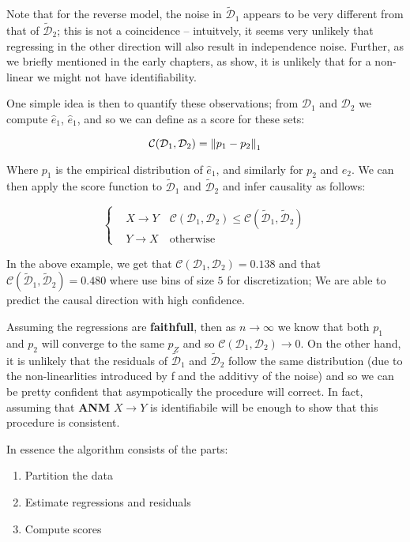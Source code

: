 Note that for the reverse model, the noise in $\mathcal{\tilde{D}}_1$ appears to be very different from 
that of $\mathcal{\tilde{D}}_2$; this is not a coincidence -- intuitvely, it seems very unlikely that 
regressing in the other direction will also result in independence noise. Further, as we briefly 
mentioned in the early chapters, as \cite{hoyer2009nonlinear} show, it is unlikely that for a non-linear 
we might not have identifiability. 

One simple idea is then to quantify these observations; from $\mathcal{D}_1$ and $\mathcal{D}_2$ we 
compute $\hat{e}_1$, $\hat{e}_1$, and so we can define as a score for these sets:

$$
     \mathcal{C}(\mathcal{D}_1, \mathcal{D}_2) = \left\lVert p_1 - p_2\right\rVert_1
$$

Where $p_1$ is the empirical distribution of $\hat{e}_1$, and similarly for $p_2$ and $\hat{e}_2$. We 
can then apply the score function to $\mathcal{\tilde{D}}_1$ and $\mathcal{\tilde{D}}_2$ and 
infer causality as follows:

\[ 
     \begin{cases} 
        & X \rightarrow Y \quad  \mathcal{C}(\mathcal{D}_1, \mathcal{D}_2) 
        \leq \mathcal{C}(\mathcal{\tilde{D}}_1, \mathcal{\tilde{D}}_2) \\
        & Y \rightarrow X \quad \text{otherwise}
     \end{cases}
\]

In the above example, we get that $\mathcal{C}(\mathcal{D}_1, \mathcal{D}_2) = 0.138$ and that
$\mathcal{C}(\mathcal{\tilde{D}}_1, \mathcal{\tilde{D}}_2) = 0.480$ where use bins of size $5$ 
for discretization; We are able to predict the causal direction with high confidence.

Assuming the regressions are \textbf{faithfull}, then as $n \rightarrow \infty$ we know that both 
$p_1$ and $p_2$ will converge to the same $p_Z$ and so $\mathcal{C}(\mathcal{D}_1, \mathcal{D}_2) \rightarrow 0$.
On the other hand, it is unlikely that the residuals of $\mathcal{\tilde{D}}_1$ and $\mathcal{\tilde{D}}_2$ 
follow the same distribution (due to the non-linearlities introduced by f and the additivy of the noise) and 
so we can be pretty confident that asympotically the procedure will correct. In fact, assuming that \textbf{ANM}
$X \rightarrow Y$ is identifiabile will be enough to show that this procedure is consistent.

In essence the algorithm consists of the parts:

\begin{enumerate}
    \item Partition the data
    \item Estimate regressions and residuals
    \item Compute scores
\end{enumerate}

